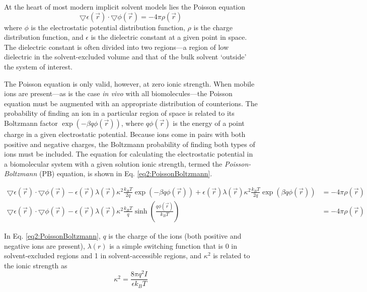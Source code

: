 At the heart of most modern implicit solvent models lies the Poisson equation
\begin{equation*}
   \bigtriangledown \epsilon(\vec{r}) \cdot \bigtriangledown \phi ( \vec{r} ) =
            -4 \pi \rho(\vec{r})
\end{equation*}
where $\phi$ is the electrostatic potential distribution function, $\rho$ is
the charge distribution function, and $\epsilon$ is the dielectric constant at a
given point in space. The dielectric constant is often divided into two
regions---a region of low dielectric in the solvent-excluded volume and that of
the bulk solvent `outside' the system of interest.
\cite{Cramer_Book_EssentialsCompChem_2004}

The Poisson equation is only valid, however, at zero ionic strength. When mobile
ions are present---as is the case \emph{in vivo} with all biomolecules---the
Poisson equation must be augmented with an appropriate distribution of
counterions. The probability of finding an ion in a particular region of space
is related to its Boltzmann factor $\exp (-\beta q \phi(\vec{r}))$, where $q
\phi(\vec{r})$ is the energy of a point charge in a given electrostatic
potential. Because ions come in pairs with both positive and negative charges,
the Boltzmann probability of finding both types of ions must be included. The
equation for calculating the electrostatic potential in a biomolecular system
with a given solution ionic strength, termed the \emph{Poisson-Boltzmann} (PB)
equation, is shown in Eq. \ref{eq2:PoissonBoltzmann}.
\cite{Cramer_Book_EssentialsCompChem_2004}

\begin{align}
   \bigtriangledown \epsilon(\vec{r}) \cdot \bigtriangledown \phi(\vec{r}) -
      \epsilon(\vec{r}) \lambda(\vec{r}) \kappa^2 \frac{k_B T} {2 q} \exp \left
      ( -\beta q \phi(\vec{r}) \right ) + \epsilon(\vec{r}) \lambda(\vec{r})
      \kappa^2 \frac{k_B T} {2 q}  \exp \left ( \beta q \phi(\vec{r})
      \right ) & = -4 \pi \rho (\vec{r}) \nonumber \\ \bigtriangledown
      \epsilon(\vec{r}) \cdot \bigtriangledown \phi(\vec{r}) - \epsilon(\vec{r})
      \lambda(\vec{r}) \kappa^2 \frac{k_B T} q \sinh \left ( \frac {q
      \phi(\vec{r})} {k_B T} \right ) & = -4 \pi \rho (\vec{r})
   \label{eq2:PoissonBoltzmann}
\end{align}

In Eq. \ref{eq2:PoissonBoltzmann}, $q$ is the charge of the ions (both positive
and negative ions are present), $\lambda(r)$ is a simple switching function that
is 0 in solvent-excluded regions and 1 in solvent-accessible regions, and
$\kappa^2$ is related to the ionic strength as
\begin{equation*}
   \kappa ^ 2 = \frac {8 \pi q ^ 2 I} {\epsilon k_B T}
\end{equation*}

